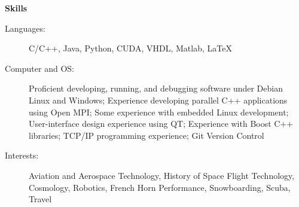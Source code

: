 \documentclass[letterpaper,11pt]{article}
\newcommand{\resheading}[1]{{\large \colorbox{mygrey}{\begin{minipage}{\textwidth}{\textbf{#1 \vphantom{p\^{E}}}}\end{minipage}}}}
\begin{document}
\resheading{Skills}
	\begin{description}
		\item[Languages:] { \footnotesize C/C++, Java, Python, CUDA, VHDL, Matlab, \LaTeX}
		\item[Computer and OS:] { \footnotesize Proficient developing, running, and debugging software under Debian Linux and Windows; Experience developing parallel C++ applications using Open MPI; Some experience with embedded Linux development; User-interface design experience using QT; Experience with Boost C++ libraries; TCP/IP programming experience; Git Version Control}
		\item[Interests:] { \footnotesize Aviation and Aerospace Technology, History of Space Flight Technology, Cosmology, Robotics, French Horn Performance, Snowboarding, Scuba, Travel }
	\end{description} %
\end{document}
